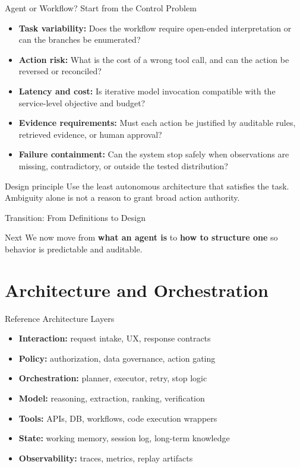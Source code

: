 \documentclass[aspectratio=169]{beamer}
\begin{document}
\begin{frame}{Agent or Workflow? Start from the Control Problem}
  \begin{itemize}
    \item \textbf{Task variability:} Does the workflow require open-ended interpretation or can the branches be enumerated?
    \item \textbf{Action risk:} What is the cost of a wrong tool call, and can the action be reversed or reconciled?
    \item \textbf{Latency and cost:} Is iterative model invocation compatible with the service-level objective and budget?
    \item \textbf{Evidence requirements:} Must each action be justified by auditable rules, retrieved evidence, or human approval?
    \item \textbf{Failure containment:} Can the system stop safely when observations are missing, contradictory, or outside the tested distribution?
  \end{itemize}

  \begin{alertbox}{Design principle}
    Use the least autonomous architecture that satisfies the task. Ambiguity alone is not a reason to grant broad action authority.
  \end{alertbox}
\end{frame}

\begin{frame}{Transition: From Definitions to Design}
  \begin{block}{Next}
    We now move from \textbf{what an agent is} to \textbf{how to structure one} so behavior is predictable and auditable.
  \end{block}
\end{frame}

\section{Architecture and Orchestration}

\begin{frame}{Reference Architecture Layers}
  \begin{itemize}
    \item \textbf{Interaction:} request intake, UX, response contracts
    \item \textbf{Policy:} authorization, data governance, action gating
    \item \textbf{Orchestration:} planner, executor, retry, stop logic
    \item \textbf{Model:} reasoning, extraction, ranking, verification
    \item \textbf{Tools:} APIs, DB, workflows, code execution wrappers
    \item \textbf{State:} working memory, session log, long-term knowledge
    \item \textbf{Observability:} traces, metrics, replay artifacts
  \end{itemize}
\end{frame}
\end{document}

